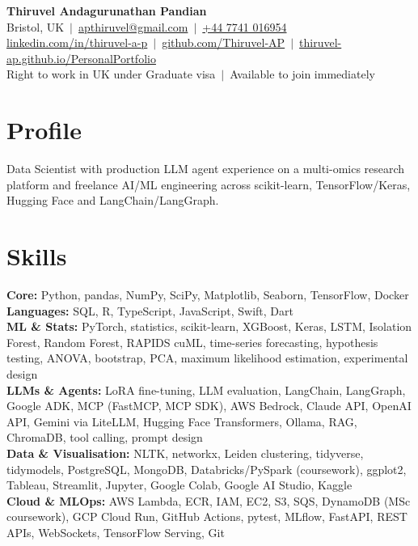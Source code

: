 \documentclass[a4paper,11pt]{article}
\begin{document}
\fontsize{11}{13.2}\selectfont

\begin{center}
  {\LARGE\bfseries Thiruvel Andagurunathan Pandian}\\[3pt]
  Bristol, UK \,$|$\, \href{mailto:apthiruvel@gmail.com}{apthiruvel@gmail.com} \,$|$\, \href{tel:+447741016954}{+44 7741 016954}\\[1pt]
\href{https://www.linkedin.com/in/thiruvel-a-p/}{linkedin.com/in/thiruvel-a-p} \,$|$\, \href{https://github.com/Thiruvel-AP}{github.com/Thiruvel-AP} \,$|$\, \href{https://thiruvel-ap.github.io/PersonalPortfolio/}{thiruvel-ap.github.io/PersonalPortfolio}\\[1pt]
  Right to work in UK under Graduate visa \,$|$\, Available to join immediately
\end{center}

\section{Profile}
Data Scientist with production LLM agent experience on a multi-omics research platform and freelance AI/ML engineering across scikit-learn, TensorFlow/Keras, Hugging Face and LangChain/LangGraph.

\section{Skills}
\textbf{Core:} Python, pandas, NumPy, SciPy, Matplotlib, Seaborn, TensorFlow, Docker\\[2pt]
\textbf{Languages:} SQL, R, TypeScript, JavaScript, Swift, Dart\\[2pt]
\textbf{ML \& Stats:} PyTorch, statistics, scikit-learn, XGBoost, Keras, LSTM, Isolation Forest, Random Forest, RAPIDS cuML, time-series forecasting, hypothesis testing, ANOVA, bootstrap, PCA, maximum likelihood estimation, experimental design\\[2pt]
\textbf{LLMs \& Agents:} LoRA fine-tuning, LLM evaluation, LangChain, LangGraph, Google ADK, MCP (FastMCP, MCP SDK), AWS Bedrock, Claude API, OpenAI API, Gemini via LiteLLM, Hugging Face Transformers, Ollama, RAG, ChromaDB, tool calling, prompt design\\[2pt]
\textbf{Data \& Visualisation:} NLTK, networkx, Leiden clustering, tidyverse, tidymodels, PostgreSQL, MongoDB, Databricks/PySpark (coursework), ggplot2, Tableau, Streamlit, Jupyter, Google Colab, Google AI Studio, Kaggle\\[2pt]
\textbf{Cloud \& MLOps:} AWS Lambda, ECR, IAM, EC2, S3, SQS, DynamoDB (MSc coursework), GCP Cloud Run, GitHub Actions, pytest, MLflow, FastAPI, REST APIs, WebSockets, TensorFlow Serving, Git
\end{document}
